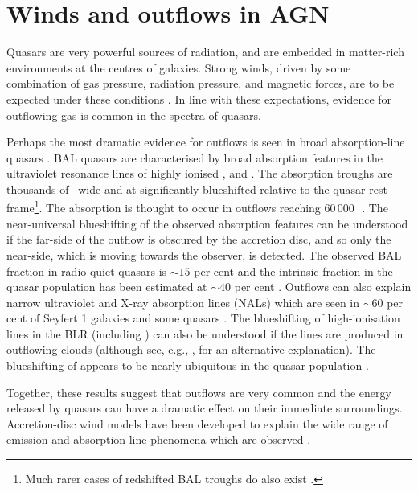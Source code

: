 \section{Winds and outflows in AGN}

Quasars are very powerful sources of radiation, and are embedded in matter-rich environments at the centres of galaxies.
Strong winds, driven by some combination of gas pressure, radiation pressure, and magnetic forces, are to be expected under these conditions \citep[e.g.][]{blandford82b,proga00,everett05}. 
In line with these expectations, evidence for outflowing gas is common in the spectra of quasars. 

Perhaps the most dramatic evidence for outflows is seen in broad absorption-line quasars \citep[BAL quasars;][]{weymann91}.
BAL quasars are characterised by broad absorption features in the ultraviolet resonance lines of highly ionised ,  and . 
The absorption troughs are thousands of \kms\, wide and at significantly blueshifted relative to the quasar rest-frame\footnote{Much rarer cases of redshifted BAL troughs do also exist \citep[e.g.][]{hall13}.}. 
The absorption is thought to occur in outflows reaching $60\,000$\,\kms\, \citep[e.g.][]{turnshek88}. 
The near-universal blueshifting of the observed absorption features can be understood if the far-side of the outflow is obscured by the accretion disc, and so only the near-side, which is moving towards the observer, is detected. 
The observed  BAL fraction in radio-quiet quasars is $\sim15$ per cent \citep[e.g.][]{hewett03,reichard03} and the intrinsic fraction in the quasar population has been estimated at $\sim40$ per cent \citep{allen11}.
Outflows can also explain narrow ultraviolet and X-ray absorption lines (NALs) which are seen in $\sim60$ per cent of Seyfert 1 galaxies \citep{crenshaw99} and some quasars \citep[e.g.][]{hamann97}. 
The blueshifting of high-ionisation lines in the BLR (including ) can also be understood if the lines are produced in outflowing clouds (although see, e.g., \citealt{gaskell16}, for an alternative explanation). 
The blueshifting of  appears to be nearly ubiquitous in the quasar population \citep[e.g.][]{richards02,richards11}. 

Together, these results suggest that outflows are very common and the energy released by quasars can have a dramatic effect on their immediate surroundings. 
Accretion-disc wind models have been developed to explain the wide range of emission and absorption-line phenomena which are observed \citep[e.g.][]{murray95,elvis00,proga00,everett05}.
  
